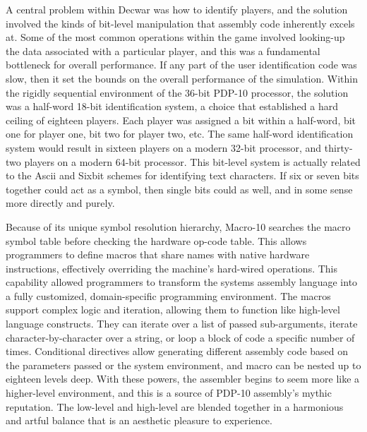 A central problem within Decwar was how to identify players, and the solution involved the kinds of bit-level manipulation that assembly code inherently excels at. Some of the most common operations within the game involved looking-up the data associated with a particular player, and this was a fundamental bottleneck for overall performance. If any part of the user identification code was slow, then it set the bounds on the overall performance of the simulation. Within the rigidly sequential environment of the 36-bit PDP-10 processor, the solution was a half-word 18-bit identification system, a choice that established a hard ceiling of eighteen players. Each player was assigned a bit within a half-word, bit one for player one, bit two for player two, etc. The same half-word identification system would result in sixteen players on a modern 32-bit processor, and thirty-two players on a modern 64-bit processor. This bit-level system is actually related to the Ascii and Sixbit schemes for identifying text characters. If six or seven bits together could act as a symbol, then single bits could as well, and in some sense more directly and purely.

Because of its unique symbol resolution hierarchy, Macro-10 searches the macro symbol table before checking the hardware op-code table. This allows programmers to define macros that share names with native hardware instructions, effectively overriding the machine's hard-wired operations. This capability allowed programmers to transform the systems assembly language into a fully customized, domain-specific programming environment. The macros support complex logic and iteration, allowing them to function like high-level language constructs. They can iterate over a list of passed sub-arguments, iterate character-by-character over a string, or loop a block of code a specific number of times. Conditional directives allow generating different assembly code based on the parameters passed or the system environment, and macro can be nested up to eighteen levels deep. With these powers, the assembler begins to seem more like a higher-level environment, and this is a source of PDP-10 assembly’s mythic reputation. The low-level and high-level are blended together in a harmonious and artful balance that is an aesthetic pleasure to experience.

